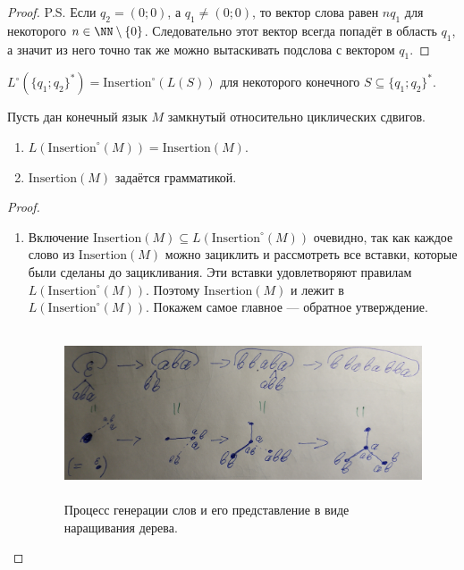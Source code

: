 \documentclass[12pt,a4paper]{article}
\newcommand{\Insertion}{\mathrm{Insertion}}
\newcommand{\Insertioncirc}{\mathrm{Insertion}^\circ}
\begin{document}
\begin{problem}{8}
\begin{enumerate}
\begin{proof}
                    P.S. Если $q_2 = (0; 0)$, а $q_1 \neq (0; 0)$, то вектор слова равен $n q_1$ для некоторого $n \in \NN \setminus \{0\}$. Следовательно этот вектор всегда попадёт в область $q_1$, а значит из него точно так же можно вытаскивать подслова с вектором $q_1$.
                \end{proof}

                \begin{corollary}
                    $L^\circ(\{q_1; q_2\}^*) = \Insertioncirc(L(S))$ для некоторого конечного $S \subseteq \{q_1; q_2\}^*$.
                \end{corollary}

                \begin{lemma}
                    Пусть дан конечный язык $M$ замкнутый относительно циклических сдвигов.
                    \begin{enumerate}
                        \item $L(\Insertioncirc(M)) = \Insertion(M)$.
                        \item $\Insertion(M)$ задаётся грамматикой.
                    \end{enumerate}
                \end{lemma}
                
                \begin{proof}
                    \begin{enumerate}
                        \item Включение $\Insertion(M) \subseteq L(\Insertioncirc(M))$ очевидно, так как каждое слово из $\Insertion(M)$ можно зациклить и рассмотреть все вставки, которые были сделаны до зацикливания. Эти вставки удовлетворяют правилам $L(\Insertioncirc(M))$. Поэтому $\Insertion(M)$ и лежит в $L(\Insertioncirc(M))$. Покажем самое главное --- обратное утверждение.
                            
                            \begin{figure}[H]
                                \centering
                                \includegraphics[height=5cm]{TI-HW-006-6.jpg}
                                \caption{Процесс генерации слов и его представление в виде наращивания дерева.}
                            \end{figure}


\end{enumerate}
\end{proof}
\end{enumerate}
\end{problem}
\end{document}
